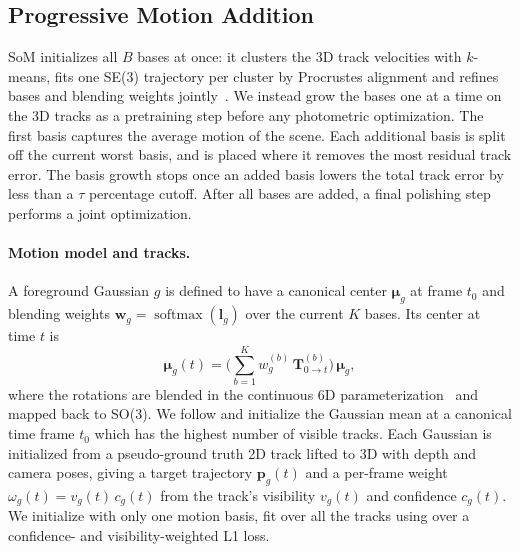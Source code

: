 
\subsection{Progressive Motion Addition}
\label{sec:split-init}

SoM initializes all $B$ bases at once: it clusters the 3D track velocities with $k$-means, fits one SE(3) trajectory per
cluster by Procrustes alignment and refines bases and blending weights jointly~\cite{wang2025shape}. We instead grow the
bases one at a time on the 3D tracks as a pretraining step before any photometric optimization. The first basis captures the average motion of
the scene. Each additional basis is split off the current worst basis, and is placed where it removes the most residual track error. 
The basis growth stops once an added basis lowers the total track error by less than a $\tau$ percentage cutoff.
After all bases are added, a final polishing step performs a joint optimization.
\paragraph{Motion model and tracks.}

A foreground Gaussian $g$ is defined to have a canonical center $\boldsymbol{\mu}_g$ at frame $t_0$ and blending weights
$\mathbf{w}_g = \operatorname{softmax}(\mathbf{l}_g)$ over the current $K$ bases. Its center at time $t$ is
\begin{equation}
  \boldsymbol{\mu}_g(t) = \Big(\sum_{b=1}^{K} w^{(b)}_g\, \mathbf{T}^{(b)}_{0\to t}\Big)\, \boldsymbol{\mu}_g ,
  \label{eq:blend}
\end{equation}
where the rotations are blended in the continuous 6D parameterization~\cite{zhou2019continuity} and mapped back to
SO(3). We follow \citep{wang2025shape} and initialize the Gaussian mean at a canonical time frame $t_0$ which has the highest number of visible tracks. Each Gaussian is initialized from a pseudo-ground truth 2D track lifted to 3D with depth and camera poses, giving a target
trajectory $\mathbf{p}_g(t)$ and a per-frame weight $\omega_g(t) = v_g(t)\, c_g(t)$ from the track's visibility $v_g(t)$
and confidence $c_g(t)$. We initialize with only one motion basis, fit over all the tracks using over a confidence- and visibility-weighted L1 loss. 

